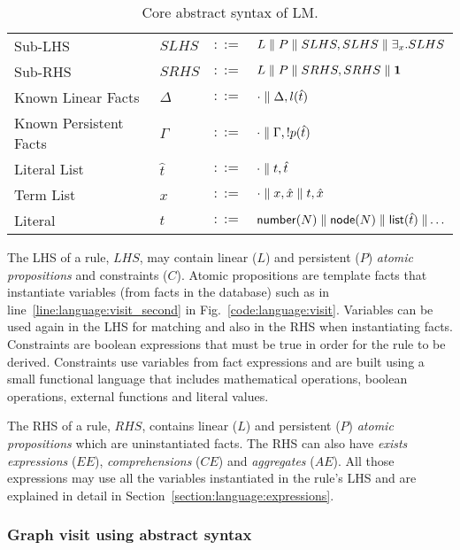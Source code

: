 \begin{table}[h]
\begin{tabular}{ l l c l }
  Sub-LHS & $SLHS$ & $::=$ & $L \; \Vert \; P \; \Vert \; SLHS, SLHS \; \Vert \; \exists_{x}. SLHS$\\
  Sub-RHS & $SRHS$ & $::=$ & $L \; \Vert \; P \; \Vert \; SRHS, SRHS \; \Vert \; \mathbf{1}$\\
  
  Known Linear Facts & $\Delta$ & $::=$ & $\cdot \; \Vert \; \Delta, l(\hat{t})$ \\
  Known Persistent Facts & $\Gamma$ & $::=$ & $\cdot \; \Vert \; \Gamma, {!} p(\hat{t})$ \\

  Literal List & $\hat{t}$ & $::=$ & $\cdot \; \Vert \; t, \hat{t}$ \\
  Term List & $\hat{x}$ & $::=$ & $\cdot \; \Vert \; x, \hat{x} \; \Vert \; t, \hat{x}$ \\
  Literal & $t$ & $::=$ & $\mathsf{number}(N) \; \Vert \; \mathsf{node}(N) \; \Vert \; \mathsf{list}(\hat{t}) \; \Vert \ldots$ \\
\end{tabular}
\caption{Core abstract syntax of LM.}\label{tbl:language:ast}
\end{table}

The LHS of a rule, $LHS$, may contain linear ($L$) and persistent ($P$)
\emph{atomic propositions} and constraints ($C$). Atomic propositions are
template facts that instantiate variables (from facts in the database) such as
 in line~\ref{line:language:visit_second} in
Fig.~\ref{code:language:visit}. Variables can be used again in the LHS for
matching and also in the RHS when instantiating facts.  Constraints are boolean
expressions that must be true in order for the rule to be derived. Constraints
use variables from fact expressions and are built using a small functional
language that includes mathematical operations, boolean operations, external
functions and literal values.

The RHS of a rule, $RHS$, contains linear ($L$) and persistent ($P$)
\emph{atomic propositions} which are uninstantiated facts. The RHS can also have
\emph{exists expressions} ($EE$), \emph{comprehensions} ($CE$) and
\emph{aggregates} ($AE$). All those expressions may use all the variables
instantiated in the rule's LHS and are explained in detail in
Section~\ref{section:language:expressions}.

\subsubsection{Graph visit using abstract syntax}\label{visit:ast}

